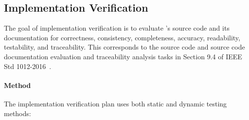 \subsection{Implementation Verification}\label{plan:implementation}
The goal of implementation verification is to evaluate \progname{}'s source
code and its documentation for correctness, consistency, completeness,
accuracy, readability, testability, and traceability. This corresponds to the
source code and source code documentation evaluation and traceability analysis
tasks in Section 9.4 of IEEE Std 1012-2016~\citep{vvIEEE}.

\paragraph{Method} The implementation verification plan uses both static and
dynamic testing methods:
